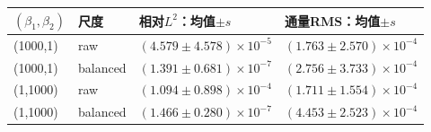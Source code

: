 \begin{tabular}{llll}\toprule
$(\beta_1,\beta_2)$ & 尺度 & 相对$L^2$：均值$\pm s$ & 通量RMS：均值$\pm s$ \\ \midrule
(1000,1) & raw & $(4.579\pm4.578)\times10^{-5}$ & $(1.763\pm2.570)\times10^{-4}$ \\
(1000,1) & balanced & $(1.391\pm0.681)\times10^{-7}$ & $(2.756\pm3.733)\times10^{-4}$ \\
(1,1000) & raw & $(1.094\pm0.898)\times10^{-4}$ & $(1.711\pm1.554)\times10^{-4}$ \\
(1,1000) & balanced & $(1.466\pm0.280)\times10^{-7}$ & $(4.453\pm2.523)\times10^{-4}$ \\
\bottomrule\end{tabular}
